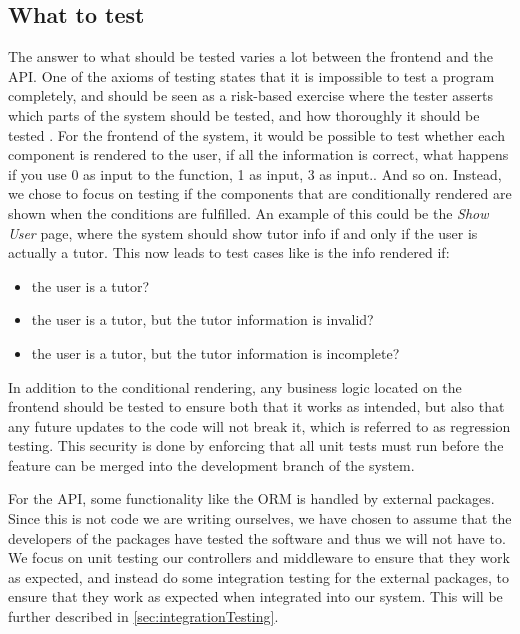 \subsection{What to test}
The answer to what should be tested varies a lot between the frontend and the API.
One of the axioms of testing states that it is impossible to test a program completely, and should be seen as a risk-based exercise where the tester asserts which parts of the system should be tested, and how thoroughly it should be tested \cite{SoftwareTesting}.
For the frontend of the system, it would be possible to test whether each component is rendered to the user, if all the information is correct, what happens if you use 0 as input to the function, 1 as input, 3 as input.. And so on.
Instead, we chose to focus on testing if the components that are conditionally rendered are shown when the conditions are fulfilled.
An example of this could be the \textit{Show User} page, where the system should show tutor info if and only if the user is actually a tutor.
This now leads to test cases like is the info rendered if:
\begin{itemize}
    \item the user is a tutor?
    \item the user is a tutor, but the tutor information is invalid?
    \item the user is a tutor, but the tutor information is incomplete?
\end{itemize}

In addition to the conditional rendering, any business logic located on the frontend should be tested to ensure both that it works as intended, but also that any future updates to the code will not break it, which is referred to as regression testing.
This security is done by enforcing that all unit tests must run before the feature can be merged into the development branch of the system.

For the API, some functionality like the ORM is handled by external packages.
Since this is not code we are writing ourselves, we have chosen to assume that the developers of the packages have tested the software and thus we will not have to.
We focus on unit testing our controllers and middleware to ensure that they work as expected, and instead do some integration testing for the external packages, to ensure that they work as expected when integrated into our system.
This will be further described in \autoref{sec:integrationTesting}.

